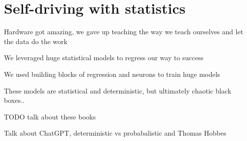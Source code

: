 \setchapterpreamble[u]{\margintoc}
\chapter{Self-driving with statistics}


Hardware got amazing, we gave up teaching the way we teach ourselves and let the data do the work

We leveraged huge statistical models to regress our way to success

We used building blocks of regression and neurons to train huge models

These models are statistical and deterministic, but ultimately chaotic black boxes..

TODO talk about these books \cite{MacAskill2022} \cite{Metz2022Sep} \cite{Metz2022Sep2} \cite{Aytekin}

Talk about ChatGPT, deterministic vs probabalistic and Thomas Hobbes

